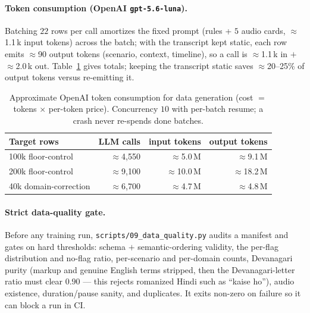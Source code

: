 \documentclass[11pt]{article}
\newcommand{\code}[1]{\texttt{#1}}
\begin{document}
\paragraph{Token consumption (OpenAI \code{gpt-5.6-luna}).} Batching $22$ rows per call
amortizes the fixed prompt (rules + $5$ audio cards, $\approx$1.1\,k input tokens) across the
batch; with the transcript kept static, each row emits $\approx$90 output tokens (scenario,
context, timeline), so a call is $\approx$1.1\,k in $+$ $\approx$2.0\,k out. Table~\ref{tab:tok}
gives totals; keeping the transcript static saves $\approx$20--25\% of output tokens versus
re-emitting it.
\begin{table}[h]\centering\small
\begin{tabular}{@{}lrrr@{}}
\toprule
Target rows & LLM calls & input tokens & output tokens\\
\midrule
100k floor-control & $\approx$4{,}550 & $\approx$5.0\,M & $\approx$9.1\,M\\
200k floor-control & $\approx$9{,}100 & $\approx$10.0\,M & $\approx$18.2\,M\\
40k domain-correction & $\approx$6{,}700 & $\approx$4.7\,M & $\approx$4.8\,M\\
\bottomrule
\end{tabular}
\caption{Approximate OpenAI token consumption for data generation (cost $=$ tokens $\times$
per-token price). Concurrency $10$ with per-batch resume; a crash never re-spends done batches.}
\label{tab:tok}
\end{table}

\paragraph{Strict data-quality gate.} Before any training run, \code{scripts/09\_data\_quality.py}
audits a manifest and gates on hard thresholds: schema $+$ semantic-ordering validity, the
per-flag distribution and no-flag ratio, per-scenario and per-domain counts, Devanagari purity
(markup and genuine English terms stripped, then the Devanagari-letter ratio must clear $0.90$
--- this rejects romanized Hindi such as ``kaise ho''), audio existence, duration/pause sanity,
and duplicates. It exits non-zero on failure so it can block a run in CI.
\end{document}
